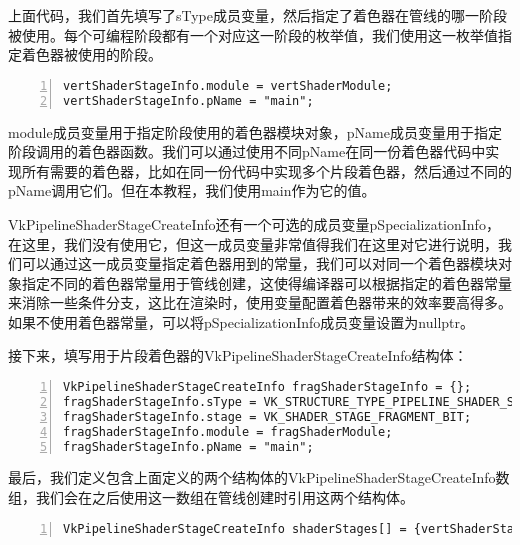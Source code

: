 \documentclass{ctexart}
\begin{document}
上面代码，我们首先填写了sType成员变量，然后指定了着色器在管线的哪一阶段被使用。每个可编程阶段都有一个对应这一阶段的枚举值，我们使用这一枚举值指定着色器被使用的阶段。

\begin{lstlisting}[language={[ANSI]C},keywordstyle=\color{blue!70},commentstyle=\color{red!50!green!50!blue!50},frame=shadowbox, rulesepcolor=\color{red!20!green!20!blue!20},basicstyle=\small,numbers=left, numberstyle=\tiny,breaklines=true]
vertShaderStageInfo.module = vertShaderModule;
vertShaderStageInfo.pName = "main";
\end{lstlisting}

module成员变量用于指定阶段使用的着色器模块对象，pName成员变量用于指定阶段调用的着色器函数。我们可以通过使用不同pName在同一份着色器代码中实现所有需要的着色器，比如在同一份代码中实现多个片段着色器，然后通过不同的pName调用它们。但在本教程，我们使用main作为它的值。

VkPipelineShaderStageCreateInfo还有一个可选的成员变量pSpecializationInfo，在这里，我们没有使用它，但这一成员变量非常值得我们在这里对它进行说明，我们可以通过这一成员变量指定着色器用到的常量，我们可以对同一个着色器模块对象指定不同的着色器常量用于管线创建，这使得编译器可以根据指定的着色器常量来消除一些条件分支，这比在渲染时，使用变量配置着色器带来的效率要高得多。如果不使用着色器常量，可以将pSpecializationInfo成员变量设置为nullptr。

接下来，填写用于片段着色器的VkPipelineShaderStageCreateInfo结构体：

\begin{lstlisting}[language={[ANSI]C},keywordstyle=\color{blue!70},commentstyle=\color{red!50!green!50!blue!50},frame=shadowbox, rulesepcolor=\color{red!20!green!20!blue!20},basicstyle=\small,numbers=left, numberstyle=\tiny,breaklines=true]
VkPipelineShaderStageCreateInfo fragShaderStageInfo = {};
fragShaderStageInfo.sType = VK_STRUCTURE_TYPE_PIPELINE_SHADER_STAGE_CREATE_INFO;
fragShaderStageInfo.stage = VK_SHADER_STAGE_FRAGMENT_BIT;
fragShaderStageInfo.module = fragShaderModule;
fragShaderStageInfo.pName = "main";
\end{lstlisting}

最后，我们定义包含上面定义的两个结构体的VkPipelineShaderStageCreateInfo数组，我们会在之后使用这一数组在管线创建时引用这两个结构体。

\begin{lstlisting}[language={[ANSI]C},keywordstyle=\color{blue!70},commentstyle=\color{red!50!green!50!blue!50},frame=shadowbox, rulesepcolor=\color{red!20!green!20!blue!20},basicstyle=\small,numbers=left, numberstyle=\tiny,breaklines=true]
VkPipelineShaderStageCreateInfo shaderStages[] = {vertShaderStageInfo, fragShaderStageInfo};
\end{lstlisting}
\end{document}

